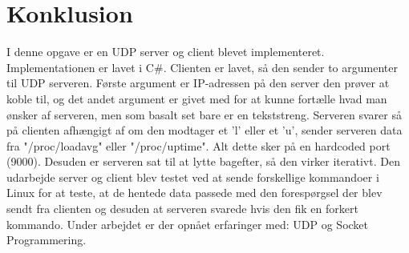 \chapter{Konklusion}\label{ch:konclusion}
I denne opgave er en UDP server og client blevet implementeret. Implementationen er lavet i C{\#}. Clienten er lavet, så den sender to argumenter til UDP serveren. Første argument er IP-adressen på den server den prøver at koble til, og det andet argument er givet med for at kunne fortælle hvad man ønsker af serveren, men som basalt set bare er en tekststreng. Serveren svarer så på clienten afhængigt af om den modtager et 'l' eller et 'u', sender serveren data fra "/proc/loadavg" eller "/proc/uptime". Alt dette sker på en hardcoded port (9000). Desuden er serveren sat til at lytte bagefter, så den virker iterativt.
Den udarbejde server og client blev testet ved at sende forskellige kommandoer i Linux for at teste, at de hentede data passede med den forespørgsel der blev sendt fra clienten og desuden at serveren svarede hvis den fik en forkert kommando. Under arbejdet er der opnået erfaringer med: UDP og Socket Programmering.